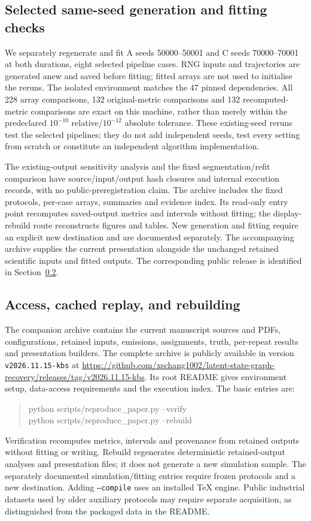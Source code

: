 \documentclass[11pt]{article}
\begin{document}
\subsection{Selected same-seed generation and fitting checks}
\label{app:fresh-checks}
We separately regenerate and fit A seeds 50000--50001 and C seeds 70000--70001
at both durations, eight selected pipeline cases. RNG inputs and trajectories
are generated anew and saved before fitting; fitted arrays are not used to
initialise the reruns. The isolated environment matches the 47 pinned
dependencies. All 228 array comparisons, 132 original-metric comparisons and
132 recomputed-metric comparisons are exact on this machine, rather than
merely within the predeclared $10^{-10}$ relative/$10^{-12}$ absolute
tolerance. These existing-seed reruns test the selected pipelines; they do
not add independent seeds, test every setting from scratch or constitute an
independent algorithm implementation.

The existing-output sensitivity analysis and the fixed segmentation/refit
comparison have source/input/output hash closures and internal execution
records, with no public-preregistration claim. The archive includes the
fixed protocols, per-case arrays, summaries and evidence index. Its read-only
entry point recomputes saved-output metrics and intervals without fitting;
the display-rebuild route reconstructs figures and tables. New generation
and fitting require an explicit new destination and are documented separately.
The accompanying archive supplies the current presentation alongside the
unchanged retained scientific inputs and fitted outputs. The corresponding
public release is identified in Section~\ref{app:reproduction}.

\subsection{Access, cached replay, and rebuilding}
\label{app:reproduction}
The companion archive 
contains the current manuscript sources and PDFs, configurations, retained
inputs, emissions, assignments, truth, per-repeat results and presentation
builders. The complete archive is publicly available in version
\texttt{v2026.11.15-kbs} at
\url{https://github.com/xschang1002/latent-state-graph-recovery/releases/tag/v2026.11.15-kbs}.
Its root README gives environment setup, data-access
requirements and the execution index. The basic entries are:
\begin{quote}\small\ttfamily
python scripts/reproduce\_paper.py --verify\\
python scripts/reproduce\_paper.py --rebuild
\end{quote}
Verification recomputes metrics, intervals and provenance from retained outputs
without fitting or writing. Rebuild regenerates deterministic retained-output
analyses and presentation files; it does not generate a new simulation sample.
The separately documented simulation/fitting entries require frozen protocols
and a new destination. Adding \texttt{--compile} uses an installed TeX engine.
Public industrial datasets used by older auxiliary protocols may require
separate acquisition, as distinguished from the packaged data in the README.
\end{document}
